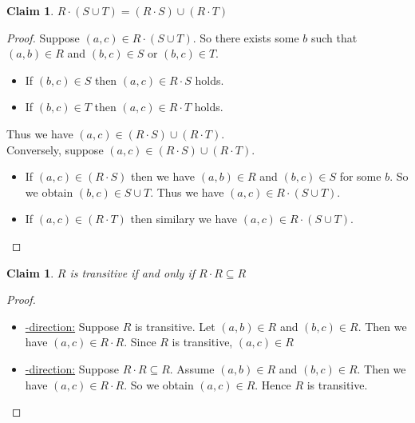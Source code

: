 \documentclass[12pt,aspectratio=169]{beamer}
\theoremstyle{claim}
\newtheorem{claim}[theorem]{Claim}%
\begin{document}
\begin{frame}
    \begin{claim}
        $R \cdot (S \cup T) = (R \cdot S) \cup (R \cdot T)$
    \end{claim}

    \begin{proof}
        Suppose $(a,c) \in R \cdot (S \cup T)$.
        So there exists some $b$ such that $(a,b) \in R$ and $(b,c) \in S$ or $(b,c) \in T$.
        \begin{itemize}
            \item If $(b,c) \in S$ then $(a,c) \in R \cdot S$ holds.
            \item If $(b,c) \in T$ then $(a,c) \in R \cdot T$ holds.
        \end{itemize}
        Thus we have $(a,c) \in (R \cdot S) \cup (R \cdot T)$.\\
        Conversely, suppose $(a,c) \in (R \cdot S) \cup (R \cdot T)$.
        \begin{itemize}
            \item If $(a,c) \in (R \cdot S)$ then we have $(a,b) \in R$ and $(b,c) \in S$ for some $b$.
            So we obtain $(b,c) \in S \cup T$. Thus we have $(a,c) \in R \cdot (S \cup T)$.
            \item If $(a,c) \in (R \cdot T)$ then similary we have $(a,c) \in R \cdot (S \cup T)$.
        \end{itemize}
    \end{proof}
\end{frame}

\begin{frame}
    \begin{claim}
        $R$ is transitive if and only if $R \cdot R \subseteq R$
    \end{claim}

    \begin{proof}
        \begin{itemize}
            \item \underline{\Rightarrow-direction:}
            Suppose $R$ is transitive.
            Let $(a,b) \in R$ and $(b,c) \in R$.
            Then we have $(a,c) \in R \cdot R$.
            Since $R$ is transitive, $(a,c) \in R$
            \item \underline{\Leftarrow-direction:}
            Suppose $R \cdot R \subseteq R$.
            Assume $(a,b) \in R$ and $(b,c) \in R$.
            Then we have $(a,c) \in R \cdot R$.
            So we obtain $(a,c) \in R$.
            Hence $R$ is transitive.
      \end{itemize}
    \end{proof}
\end{frame}
\end{document}
